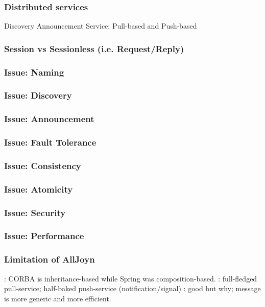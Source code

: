 \documentclass{beamer}
\begin{document}
\begin{frame}
\frametitle{Distributed services}
\bit
\w Discovery
\w Announcement
\w Service: Pull-based and Push-based
\eit
\end{frame}

\begin{frame}
\frametitle{Session vs Sessionless (i.e. Request/Reply)}
\end{frame}

\begin{frame}
\frametitle{Issue: Naming}
\end{frame}

\begin{frame}
\frametitle{Issue: Discovery}
\end{frame}

\begin{frame}
\frametitle{Issue: Announcement}
\end{frame}

\begin{frame}
\frametitle{Issue: Fault Tolerance}
\end{frame}

\begin{frame}
\frametitle{Issue: Consistency}
\end{frame}

\begin{frame}
\frametitle{Issue: Atomicity}
\end{frame}

\begin{frame}
\frametitle{Issue: Security}
\end{frame}

\begin{frame}
\frametitle{Issue: Performance}
\end{frame}

\begin{frame}
\frametitle{Limitation of AllJoyn}
\bit
\w {}: CORBA is inheritance-based while Spring was composition-based.
\w {}: full-fledged pull-service; half-baked push-service
(notification/signal)
\w {}: good but why; message is more generic and more
   efficient.  
\eit
\end{frame}
\end{document}
